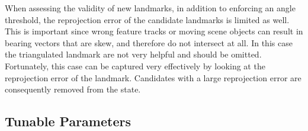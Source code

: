 \documentclass{article}
\begin{document}
When assessing the validity of new landmarks, in addition to enforcing an angle threshold, the reprojection error of the candidate landmarks is limited as well. This is important since wrong feature tracks or moving scene objects can result in bearing vectors that are skew, and therefore do not intersect at all. In this case the triangulated landmark are not very helpful and should be omitted. Fortunately, this case can be captured very effectively by looking at the reprojection error of the landmark. Candidates with a large reprojection error are consequently removed from the state.

\subsection{Tunable Parameters}

\renewcommand{\arraystretch}{1.3}
\end{document}
